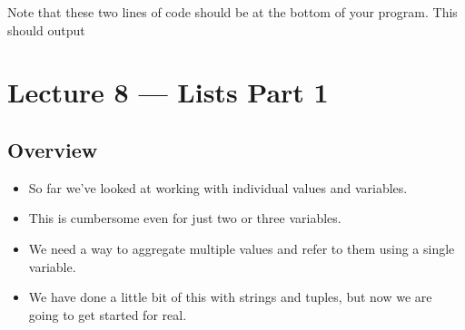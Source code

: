 \documentclass[letterpaper,10pt,english]{sphinxmanual}
\begin{document}
\begin{enumerate}
%
\begin{sphinxVerbatim}[commandchars=\\\{\}]
    
    
\end{sphinxVerbatim}

Note that these two lines of code should be at the bottom of your
program.  This should output

%
\begin{sphinxVerbatim}[commandchars=\\\{\}]
 
 
\end{sphinxVerbatim}

\end{enumerate}


\chapter{Lecture 8 — Lists Part 1}
\label{\detokenize{lecture_notes/lec08_lists1:lecture-8-lists-part-1}}\label{\detokenize{lecture_notes/lec08_lists1::doc}}

\section{Overview}
\label{\detokenize{lecture_notes/lec08_lists1:overview}}\begin{itemize}
\item {} 
So far we’ve looked at working with individual values and variables.

\item {} 
This is cumbersome even for just two or three variables.

\item {} 
We need a way to aggregate multiple values and refer to them using a
single variable.

\item {} 
We have done a little bit of this with strings and tuples, but now
we are going to get started for real.

\end{itemize}
\end{document}
